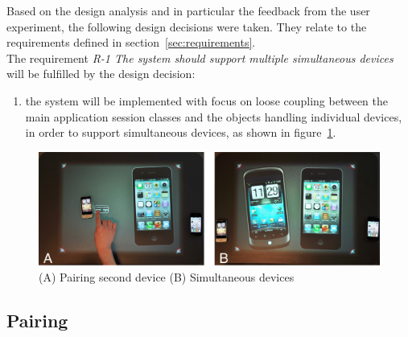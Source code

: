 Based on the design analysis and in particular the feedback from the user experiment, the following design decisions were taken.
They relate to the requirements defined in section~\ref{sec:requirements}.
\\
\linebreak
The requirement \emph{R-1 The system should support multiple simultaneous devices} will be fulfilled by the design decision:
\begin{enumerate}[{D}-1]
\item the system will be implemented with focus on loose coupling between the main application session classes and the objects handling individual devices, in order to support simultaneous devices, as shown in figure~\ref{fig:sq2phones}. 
\end{enumerate}
\begin{figure}[htb]
  \centering
    \includegraphics[width=0.7\linewidth]{images/sq2phones}
  \caption{(A) Pairing second device (B) Simultaneous devices}
  \label{fig:sq2phones}
\end{figure}

\subsection{Pairing}

